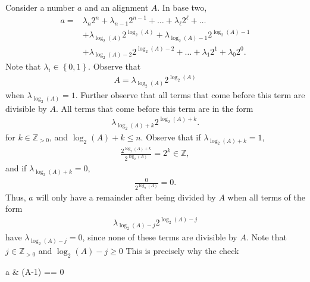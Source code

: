 \documentclass{report}
\begin{document}
\begin{itemize}
                Consider a number $a$ and an alignment $A$. In base two,
                \begin{align*}
                    a = &\lambda_{n}2^{n} + \lambda_{n-1}2^{n-1} + \ldots + \lambda_{\ell}2^{\ell} + \ldots  \\
                        &+ \lambda_{\log_{2}(A)}2^{\log_{2}(A)} + \lambda_{\log_{2}(A)-1}2^{\log_{2}(A)-1} \\
                        &+\lambda_{\log_{2}(A)-2}2^{\log_{2}(A)-2} + \ldots + \lambda_{1}2^{1} + \lambda_{0}2^{0}
                .\end{align*}
                Note that $\lambda_{i} \in \left\{0,1\right\}$. Observe that
                \begin{align*}
                    A = \lambda_{\log_{2}(A)}2^{\log_{2}(A)}
                \end{align*}
                when $\lambda_{\log_{2}(A)} = 1$. Further observe that all terms that come before this term are divisible by $A$. All terms that come before this term are in the form
                \begin{align*}
                    \lambda_{\log_{2}(A)+k}2^{\log_{2}(A) + k}
                .\end{align*}
                for $k \in \mathbb{Z}_{>0}$, and $\log_{2}(A)+k \leq n$. Observe that if $\lambda_{\log_{2}{(A)}+k} = 1$,
                \begin{align*}
                    \frac{2^{\log_{2}{(A)}+k}}{2^{\log_{2}{(A)}}} = 2^{k} \in \mathbb{Z}
                ,\end{align*}
                and if $\lambda_{\log_{2}{(A) + k}} = 0$,
                \begin{align*}
                    \frac{0}{2^{\log_{2}{(A)}}} = 0 
                .\end{align*}
                Thus, $a$ will only have a remainder after being divided by $A$  when all terms of the form
                \begin{align*}
                    \lambda_{\log_{2}{(A) - j}}2^{\log_{2}{(A)-j}} 
                \end{align*}
                have $\lambda_{\log_{2}{(A)-j}} =0$, since none of these terms are divisible by $A$. Note that $j \in \mathbb{Z}_{>0}$ and $\log_{2}{(A) - j} \geq 0$
                \bigbreak \noindent 
                This is precisely why the check
                \bigbreak \noindent 
                \begin{cppcode}
                    a & (A-1) == 0

\end{cppcode}
\end{itemize}
\end{document}
